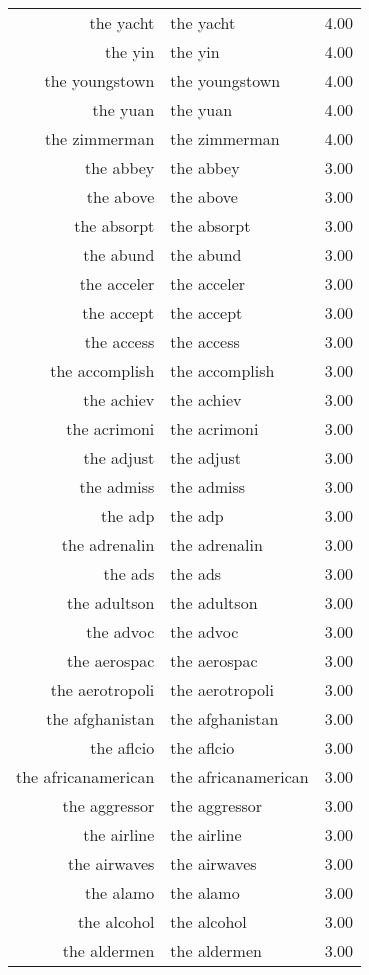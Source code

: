 \begin{table}[ht]
\begin{tabular}{rlr}
  the yacht & the yacht & 4.00 \\ 
  the yin & the yin & 4.00 \\ 
  the youngstown & the youngstown & 4.00 \\ 
  the yuan & the yuan & 4.00 \\ 
  the zimmerman & the zimmerman & 4.00 \\ 
  the abbey & the abbey & 3.00 \\ 
  the above & the above & 3.00 \\ 
  the absorpt & the absorpt & 3.00 \\ 
  the abund & the abund & 3.00 \\ 
  the acceler & the acceler & 3.00 \\ 
  the accept & the accept & 3.00 \\ 
  the access & the access & 3.00 \\ 
  the accomplish & the accomplish & 3.00 \\ 
  the achiev & the achiev & 3.00 \\ 
  the acrimoni & the acrimoni & 3.00 \\ 
  the adjust & the adjust & 3.00 \\ 
  the admiss & the admiss & 3.00 \\ 
  the adp & the adp & 3.00 \\ 
  the adrenalin & the adrenalin & 3.00 \\ 
  the ads & the ads & 3.00 \\ 
  the adultson & the adultson & 3.00 \\ 
  the advoc & the advoc & 3.00 \\ 
  the aerospac & the aerospac & 3.00 \\ 
  the aerotropoli & the aerotropoli & 3.00 \\ 
  the afghanistan & the afghanistan & 3.00 \\ 
  the aflcio & the aflcio & 3.00 \\ 
  the africanamerican & the africanamerican & 3.00 \\ 
  the aggressor & the aggressor & 3.00 \\ 
  the airline & the airline & 3.00 \\ 
  the airwaves & the airwaves & 3.00 \\ 
  the alamo & the alamo & 3.00 \\ 
  the alcohol & the alcohol & 3.00 \\ 
  the aldermen & the aldermen & 3.00 \\ 

\end{tabular}
\end{table}
